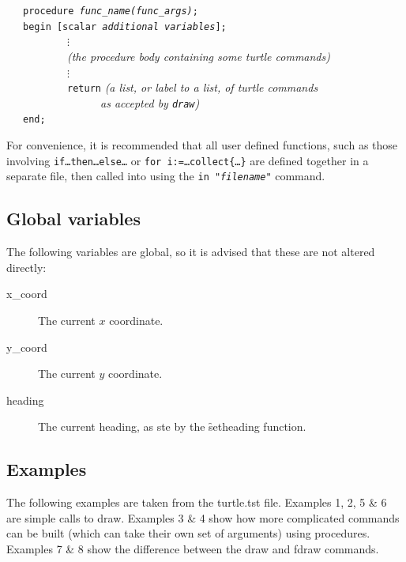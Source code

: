 
\begin{flushleft}
~~~\texttt{procedure \textit{func\_name(func\_args)};}\\
~~~\texttt{begin [scalar \textit{additional variables}];}\\
~~~~~~~~~~~$\vdots$\\
~~~~~~~~~~~\textit{(the procedure body containing some turtle commands)}\\
~~~~~~~~~~~$\vdots$\\
~~~~~~~~~~~\texttt{return} \textit{(a list, or label to a list, of turtle commands}\\
~~~~~~~~~~~~~~~~~\textit{as accepted by \texttt{draw})}\\
~~~\texttt{end;}
\end{flushleft}

  For convenience, it is recommended that all user defined functions, such
as those involving \texttt{if\ldots then\ldots else\ldots} or \texttt{for
i:=\ldots collect\{\ldots\}} are defined together in a separate file, then
called into {\REDUCE} using the \texttt{in "\textit{filename}"} command.

\subsection{Global variables}

The following variables are global, so it is advised that these are not altered directly:
\begin{description}
\item[x\_coord]
  \hypertarget{reserved:X_COORD}{}
  The current $x$ coordinate.
\item[y\_coord]
  \hypertarget{reserved:Y_COORD}{}
  The current $y$ coordinate.
\item[heading]
  \hypertarget{reserved:HEADING}{}
  The current heading, as ste by the \f{setheading} function.
\end{description}

\subsection{Examples}

The following examples are taken from the turtle.tst file.
Examples 1, 2, 5 \& 6 are simple calls to draw. Examples 3 \& 4 show how
more complicated commands can be built (which can take their own set of
arguments) using procedures. Examples 7 \& 8 show the difference between
the draw and fdraw commands.

